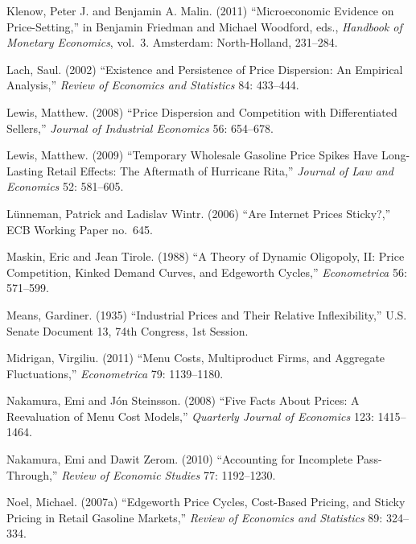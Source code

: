 \documentclass[11pt]{article}
\begin{document}
\begin{description}
\item Klenow, Peter J. and Benjamin A. Malin. (2011) ``Microeconomic
  Evidence on Price-Setting,'' in Benjamin Friedman and Michael
  Woodford, eds., {\it Handbook of Monetary Economics},
  vol.~3. Amsterdam: North-Holland, 231--284.

\item Lach, Saul. (2002) ``Existence and Persistence of Price
  Dispersion: An Empirical Analysis,'' {\it Review of Economics and
    Statistics} 84: 433--444.

\item Lewis, Matthew. (2008) ``Price Dispersion and Competition with
  Differentiated Sellers,'' {\it Journal of Industrial Economics} 56:
  654--678.

\item Lewis, Matthew. (2009) ``Temporary Wholesale Gasoline Price
  Spikes Have Long-Lasting Retail Effects: The Aftermath of Hurricane
  Rita,'' {\it Journal of Law and Economics} 52: 581--605.

\item L\"{u}nneman, Patrick and Ladislav Wintr. (2006) ``Are Internet
  Prices Sticky?,'' ECB Working Paper no.~645.

\item Maskin, Eric and Jean Tirole. (1988) ``A Theory of Dynamic
  Oligopoly, II: Price Competition, Kinked Demand Curves, and
  Edgeworth Cycles,'' {\it Econometrica} 56: 571--599.

\item Means, Gardiner. (1935) ``Industrial Prices and Their Relative
  Inflexibility,'' U.S. Senate Document 13, 74th Congress, 1st
  Session.

\item Midrigan, Virgiliu. (2011) ``Menu Costs, Multiproduct Firms, and
  Aggregate Fluctuations,'' {\it Econometrica} 79: 1139--1180.

\item Nakamura, Emi and J\'on Steinsson.  (2008) ``Five Facts About
  Prices: A Reevaluation of Menu Cost Models,'' {\it Quarterly Journal
    of Economics} 123: 1415--1464.

\item Nakamura, Emi and Dawit Zerom. (2010) ``Accounting for
  Incomplete Pass-Through,'' {\it Review of Economic Studies} 77:
  1192--1230.

\item Noel, Michael. (2007a) ``Edgeworth Price Cycles, Cost-Based
  Pricing, and Sticky Pricing in Retail Gasoline Markets,'' {\it
    Review of Economics and Statistics} 89: 324--334.


\end{description}
\end{document}
